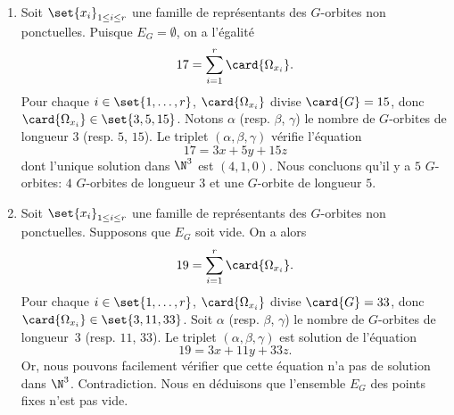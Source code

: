 \begin{enumerate}
  \item
    Soit $\set{x_i}_{1\leq i\leq r}$ une famille de représentants des
    $G$-orbites non ponctuelles. Puisque $E_G=\emptyset$, on a l'égalité
    \[
      17 = \sum_{i=1}^r \card{\Omega_{x_i}}.
    \]
    Pour chaque $i\in\set{1,\dots,r}$, $\card{\Omega_{x_i}}$ divise
    $\card{G}=15$, donc $\card{\Omega_{x_i}}\in\set{3,5,15}$. Notons $\alpha$
    (resp. $\beta$, $\gamma$) le nombre de $G$-orbites de longueur $3$ (resp.
    $5$, $15$). Le triplet $(\alpha,\beta,\gamma)$ vérifie l'équation
    \[
      17 = 3x + 5y + 15z
    \]
    dont l'unique solution dans $\N^3$ est $(4,1,0)$. Nous concluons qu'il y a
    $5$ $G$-orbites: $4$ $G$-orbites de longueur $3$ et une $G$-orbite de
    longueur $5$.
  
  \item 
    Soit $\set{x_i}_{1\leq i\leq r}$ une famille de représentants des 
    $G$-orbites non ponctuelles. Supposons que $E_G$ soit vide. On a alors
    \[
      19 = \sum_{i=1}^r \card{\Omega_{x_i}}.
    \]
    Pour chaque $i\in\set{1,\dots,r}$, $\card{\Omega_{x_i}}$ divise
    $\card{G}=33$, donc $\card{\Omega_{x_i}}\in\set{3,11,33}$. Soit $\alpha$
    (resp. $\beta$, $\gamma$) le nombre de $G$-orbites de longueur~$3$ (resp.
    $11$, $33$). Le triplet $(\alpha,\beta,\gamma)$ est solution de l'équation
    \[
      19 = 3x + 11y + 33z.
    \]
    Or, nous pouvons facilement vérifier que cette équation n'a pas de solution
    dans $\N^3$. Contradiction. Nous en déduisons que l'ensemble $E_G$ des
    points fixes n'est pas vide.
\end{enumerate}

